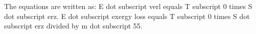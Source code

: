 The equations are written as:  
E dot subscript verl equals T subscript 0 times S dot subscript erz.  
E dot subscript exergy loss equals T subscript 0 times S dot subscript erz divided by m dot subscript 55.